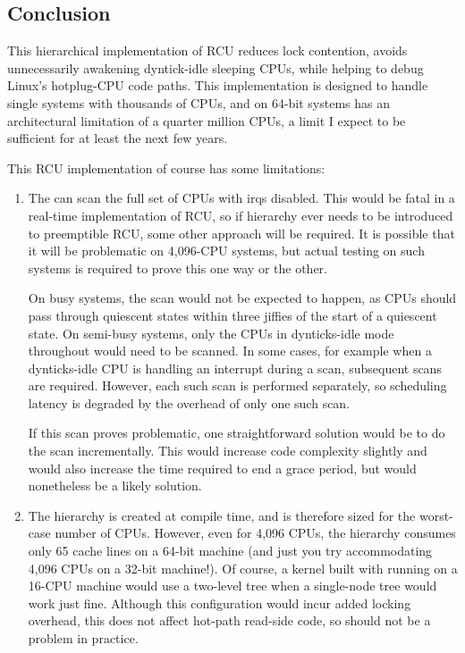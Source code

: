 \subsection{Conclusion}
\label{app:rcuimpl:rcutree:Conclusion}

This hierarchical implementation of RCU reduces lock contention,
avoids unnecessarily awakening dyntick-idle sleeping CPUs, while
helping to debug Linux's hotplug-CPU code paths.
This implementation is designed to handle single systems with
thousands of CPUs, and on 64-bit systems has an architectural
limitation of a quarter million CPUs, a limit I expect to be
sufficient for at least the next few years.

This RCU implementation of course has some limitations:

\begin{enumerate}
\item	The  can scan the full
	set of CPUs with irqs disabled.
	This would be fatal in a real-time implementation of RCU,
	so if hierarchy ever needs to be introduced to preemptible
	RCU, some other approach will be required.
	It is possible that it will be problematic on 4,096-CPU
	systems, but actual testing on such systems is required
	to prove this one way or the other.
	
	On busy systems, the  scan
	would not be expected to happen,
	as CPUs should pass through quiescent states within three
	jiffies of the start of a quiescent state.  On semi-busy
	systems, only the CPUs in dynticks-idle mode throughout would
	need to be scanned.
	In some cases, for example when a dynticks-idle CPU is handling
	an interrupt during a scan, subsequent scans are required.
	However, each such scan is performed separately, so scheduling
	latency is degraded by the overhead of only one such scan.
	
	If this scan proves problematic, one straightforward solution
	would be to do the scan incrementally.
	This would increase code complexity slightly and would also
	increase the time required to end a grace period, but would
	nonetheless be a likely solution.
	
\item	The  hierarchy is created at compile
	time, and is therefore sized for the worst-case 
	number of CPUs.
	However, even for 4,096 CPUs, the 
	hierarchy consumes only 65 cache lines on a 64-bit machine
	(and just you try accommodating 4,096 CPUs on a 32-bit machine!).
	Of course, a kernel built with 
	running on a 16-CPU machine would use a two-level tree when
	a single-node tree would work just fine.
	Although this configuration would incur added locking overhead,
	this does not affect hot-path read-side code, so should not be a
	problem in practice.
	

\end{enumerate}
